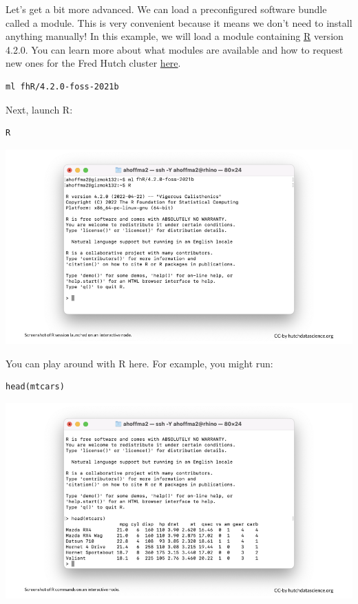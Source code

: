 \documentclass[
]{book}
\begin{document}
Let's get a bit more advanced. We can load a preconfigured software bundle called a module. This is very convenient because it means we don't need to install anything manually! In this example, we will load a module containing \href{https://www.r-project.org/}{R} version 4.2.0. You can learn more about what modules are available and how to request new ones for the Fred Hutch cluster \href{https://sciwiki.fredhutch.org/scicomputing/compute_scientificSoftware/}{here}.

\begin{verbatim}
ml fhR/4.2.0-foss-2021b
\end{verbatim}

Next, launch R:

\begin{verbatim}
R
\end{verbatim}

\includegraphics[width=1\linewidth]{resources/images/09-interactive_files/figure-latex//1BQxrVYdKZTbpCaF-i_q9w7s9x034lEXpQZDU-Sl09cs_gff2211b72f_1_65}

You can play around with R here. For example, you might run:

\begin{verbatim}
head(mtcars)
\end{verbatim}

\includegraphics[width=1\linewidth]{resources/images/09-interactive_files/figure-latex//1BQxrVYdKZTbpCaF-i_q9w7s9x034lEXpQZDU-Sl09cs_gff2211b72f_1_72}
\end{document}

